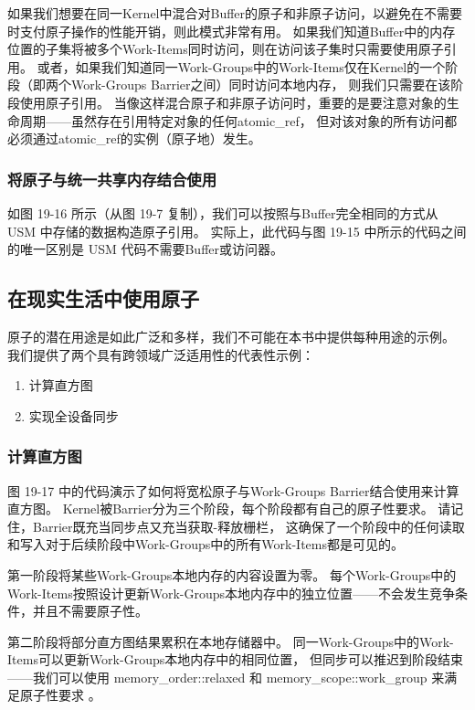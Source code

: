 如果我们想要在同一Kernel中混合对Buffer的原子和非原子访问，以避免在不需要时支付原子操作的性能开销，则此模式非常有用。 
如果我们知道Buffer中的内存位置的子集将被多个Work-Items同时访问，则在访问该子集时只需要使用原子引用。 
或者，如果我们知道同一Work-Groups中的Work-Items仅在Kernel的一个阶段（即两个Work-Groups Barrier之间）同时访问本地内存，
则我们只需要在该阶段使用原子引用。 
当像这样混合原子和非原子访问时，重要的是要注意对象的生命周期——虽然存在引用特定对象的任何atomic\_ref，
但对该对象的所有访问都必须通过atomic\_ref的实例（原子地）发生。

\subsubsection{将原子与统一共享内存结合使用}
如图 19-16 所示（从图 19-7 复制），我们可以按照与Buffer完全相同的方式从 USM 中存储的数据构造原子引用。 
实际上，此代码与图 19-15 中所示的代码之间的唯一区别是 USM 代码不需要Buffer或访问器。

\subsection{在现实生活中使用原子}
原子的潜在用途是如此广泛和多样，我们不可能在本书中提供每种用途的示例。 
我们提供了两个具有跨领域广泛适用性的代表性示例：

\begin{enumerate}
	\item 计算直方图

	\item 实现全设备同步
\end{enumerate}

\subsubsection{计算直方图}
图 19-17 中的代码演示了如何将宽松原子与Work-Groups Barrier结合使用来计算直方图。 
Kernel被Barrier分为三个阶段，每个阶段都有自己的原子性要求。 
请记住，Barrier既充当同步点又充当获取-释放栅栏，
这确保了一个阶段中的任何读取和写入对于后续阶段中Work-Groups中的所有Work-Items都是可见的。

第一阶段将某些Work-Groups本地内存的内容设置为零。 
每个Work-Groups中的Work-Items按照设计更新Work-Groups本地内存中的独立位置——不会发生竞争条件，并且不需要原子性。

第二阶段将部分直方图结果累积在本地存储器中。 
同一Work-Groups中的Work-Items可以更新Work-Groups本地内存中的相同位置，
但同步可以推迟到阶段结束——我们可以使用 memory\_order::relaxed 
和 memory\_scope::work\_group 来满足原子性要求 。

